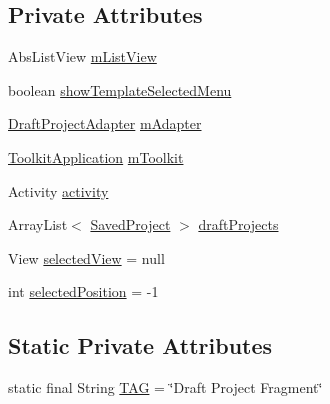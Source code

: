 \subsection*{Private Attributes}
\begin{DoxyCompactItemize}
\item 
Abs\+List\+View \hyperlink{classorg_1_1buildmlearn_1_1toolkit_1_1fragment_1_1DraftsFragment_ab2f4bc129418af539f5b333fc060f9de}{m\+List\+View}
\item 
boolean \hyperlink{classorg_1_1buildmlearn_1_1toolkit_1_1fragment_1_1DraftsFragment_ac4ba8c3a469443629064b55028e69523}{show\+Template\+Selected\+Menu}
\item 
\hyperlink{classorg_1_1buildmlearn_1_1toolkit_1_1adapter_1_1DraftProjectAdapter}{Draft\+Project\+Adapter} \hyperlink{classorg_1_1buildmlearn_1_1toolkit_1_1fragment_1_1DraftsFragment_a25bef846f7a1bae6bb165e4b5184ea49}{m\+Adapter}
\item 
\hyperlink{classorg_1_1buildmlearn_1_1toolkit_1_1ToolkitApplication}{Toolkit\+Application} \hyperlink{classorg_1_1buildmlearn_1_1toolkit_1_1fragment_1_1DraftsFragment_a58c19beba899a4c1ceb73865d658c777}{m\+Toolkit}
\item 
Activity \hyperlink{classorg_1_1buildmlearn_1_1toolkit_1_1fragment_1_1DraftsFragment_a4d1f2cf0751e65c73818f14b1119799c}{activity}
\item 
Array\+List$<$ \hyperlink{classorg_1_1buildmlearn_1_1toolkit_1_1model_1_1SavedProject}{Saved\+Project} $>$ \hyperlink{classorg_1_1buildmlearn_1_1toolkit_1_1fragment_1_1DraftsFragment_a8b6b252506b897c8fe46fca0bf5010aa}{draft\+Projects}
\item 
View \hyperlink{classorg_1_1buildmlearn_1_1toolkit_1_1fragment_1_1DraftsFragment_a61317e4e6b7b1a7abc8aad57b724d4fe}{selected\+View} = null
\item 
int \hyperlink{classorg_1_1buildmlearn_1_1toolkit_1_1fragment_1_1DraftsFragment_a133f99d6233f9f26ab03ebb14fe5f4b3}{selected\+Position} = -\/1
\end{DoxyCompactItemize}
\subsection*{Static Private Attributes}
\begin{DoxyCompactItemize}
\item 
static final String \hyperlink{classorg_1_1buildmlearn_1_1toolkit_1_1fragment_1_1DraftsFragment_a70a4f3509b545bd45556bf041b0950e1}{T\+AG} = \char`\"{}Draft Project Fragment\char`\"{}
\end{DoxyCompactItemize}



